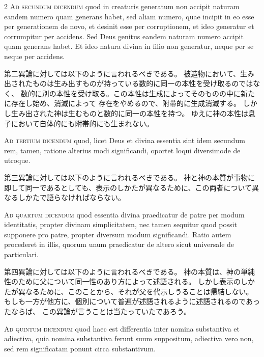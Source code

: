 \documentclass[paper=a4paper,fontsize=10pt,jafontsize=9pt,titlepage]{jlreq}
\begin{document}
\begin{paracol}{2}
\textsc{Ad secundum dicendum} quod in creaturis generatum non accipit naturam eandem
numero quam generans habet, sed aliam numero, quae incipit in eo esse per
generationem de novo, et desinit esse per corruptionem, et ideo generatur et
corrumpitur per accidens. Sed Deus genitus eandem naturam numero accipit quam
generans habet. Et ideo natura divina in filio non generatur, neque per se
neque per accidens.

\switchcolumn

第二異論に対しては以下のように言われるべきである。
被造物において、生み出されたものは生み出すものが持っている数的に同一の本性を受け取るのではなく、
数的に別の本性を受け取る。この本性は生成によってそのものの中に新たに存在し始め、消滅によって
存在をやめるので、附帯的に生成消滅する。
しかし生み出された神は生むものと数的に同一の本性を持つ。
ゆえに神の本性は息子において自体的にも附帯的にも生まれない。

\switchcolumn*

\textsc{Ad tertium dicendum} quod, licet Deus et divina essentia sint idem secundum rem,
tamen, ratione alterius modi significandi, oportet loqui diversimode de
utroque.

\switchcolumn

第三異論に対しては以下のように言われるべきである。
神と神の本質が事物に即して同一であるとしても、表示のしかたが異なるために、この両者について異なるしかたで語らなければならない。

\switchcolumn*

\textsc{Ad quartum dicendum} quod essentia divina praedicatur de patre per modum
identitatis, propter divinam simplicitatem, nec tamen sequitur quod possit
supponere pro patre, propter diversum modum significandi. Ratio autem
procederet in illis, quorum unum praedicatur de altero sicut universale de
particulari.

\switchcolumn

第四異論に対しては以下のように言われるべきである。
神の本質は、神の単純性のために父について同一性のあり方によって述語される。
しかし表示のしかたが異なるために、このことから、それが父を代示しうることは帰結しない。
もしも一方が他方に、個別について普遍が述語されるように述語されるのであったならば、
この異論が言うことは当たっていたであろう。

\switchcolumn*

\textsc{Ad quintum dicendum} quod haec est differentia inter nomina substantiva et
adiectiva, quia nomina substantiva ferunt suum suppositum, adiectiva vero non,
sed rem significatam ponunt circa substantivum.


\end{paracol}
\end{document}
